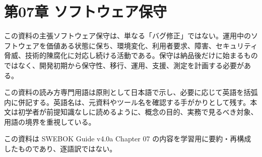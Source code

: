 \section{第07章 ソフトウェア保守}
\begin{pointbox}{この資料の主張}ソフトウェア保守は、単なる「バグ修正」ではない。運用中のソフトウェアを価値ある状態に保ち、環境変化、利用者要求、障害、セキュリティ脅威、技術的陳腐化に対応し続ける活動である。保守は納品後だけに始まるものではなく、開発初期から保守性、移行、運用、支援、測定を計画する必要がある。\end{pointbox}
\begin{pointbox}{この資料の読み方}専門用語は原則として日本語で示し、必要に応じて英語を括弧内に併記する。英語名は、元資料やツール名を確認する手がかりとして残す。本文は初学者が前提知識なしに読めるように、概念の目的、実務で見るべき対象、用語の境界を重視している。\end{pointbox}
この資料は SWEBOK Guide v4.0a Chapter 07 の内容を学習用に要約・再構成したものであり、逐語訳ではない。\par
